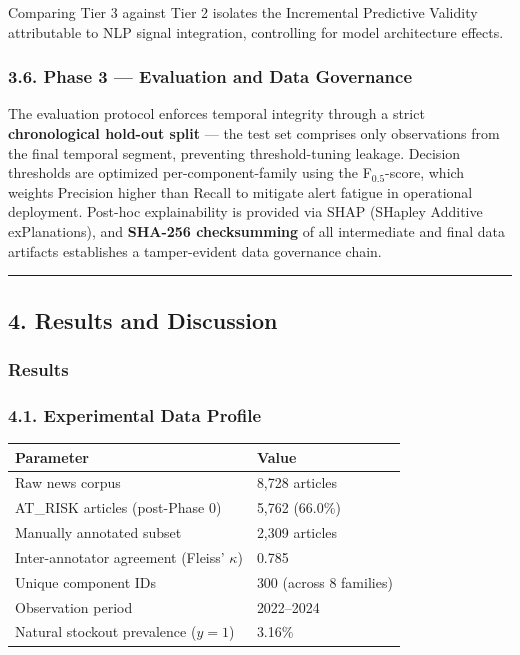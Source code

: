 \documentclass[conference]{IEEEtran}
\begin{document}
Comparing Tier 3 against Tier 2 isolates the Incremental Predictive
Validity attributable to NLP signal integration, controlling for model
architecture effects.

\subsubsection{3.6. Phase 3 --- Evaluation and Data
Governance}\label{phase-3-evaluation-and-data-governance}

The evaluation protocol enforces temporal integrity through a strict
\textbf{chronological hold-out split} --- the test set comprises only
observations from the final temporal segment, preventing
threshold-tuning leakage. Decision thresholds are optimized
per-component-family using the F\(_{0.5}\)-score, which weights
Precision higher than Recall to mitigate alert fatigue in operational
deployment. Post-hoc explainability is provided via SHAP (SHapley
Additive exPlanations), and \textbf{SHA-256 checksumming} of all
intermediate and final data artifacts establishes a tamper-evident data
governance chain.

\begin{center}\rule{0.5\linewidth}{0.5pt}\end{center}

\subsection{4. Results and Discussion}\label{results-and-discussion}

\subsubsection{Results}\label{results}

\subsubsection{4.1. Experimental Data
Profile}\label{experimental-data-profile}

\begin{longtable}[]{@{}ll@{}}
\toprule\noalign{}
Parameter & Value \\
\midrule\noalign{}
\endhead
\bottomrule\noalign{}
\endlastfoot
Raw news corpus & 8,728 articles \\
AT\_RISK articles (post-Phase 0) & 5,762 (66.0\%) \\
Manually annotated subset & 2,309 articles \\
Inter-annotator agreement (Fleiss' \(\kappa\)) & 0.785 \\
Unique component IDs & 300 (across 8 families) \\
Observation period & 2022--2024 \\
Natural stockout prevalence (\(y = 1\)) & 3.16\% \\
\end{longtable}
\end{document}
